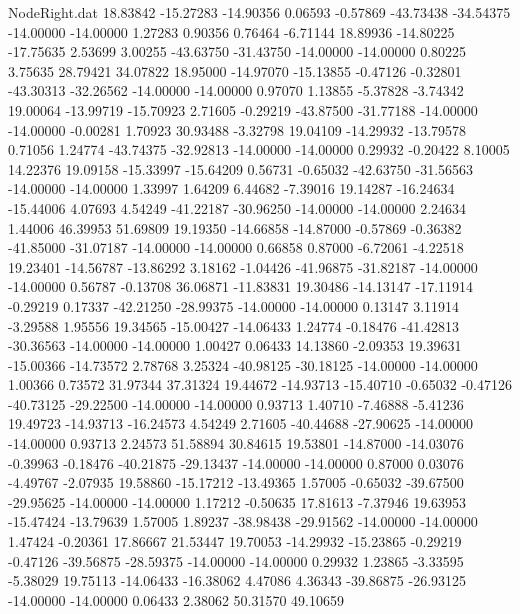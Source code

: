 \begin{filecontents}{NodeRight.dat}
  18.83842  -15.27283  -14.90356     0.06593   -0.57869  -43.73438  -34.54375  -14.00000  -14.00000    1.27283    0.90356    0.76464   -6.71144
  18.89936  -14.80225  -17.75635     2.53699    3.00255  -43.63750  -31.43750  -14.00000  -14.00000    0.80225    3.75635   28.79421   34.07822
  18.95000  -14.97070  -15.13855    -0.47126   -0.32801  -43.30313  -32.26562  -14.00000  -14.00000    0.97070    1.13855   -5.37828   -3.74342
  19.00064  -13.99719  -15.70923     2.71605   -0.29219  -43.87500  -31.77188  -14.00000  -14.00000   -0.00281    1.70923   30.93488   -3.32798
  19.04109  -14.29932  -13.79578     0.71056    1.24774  -43.74375  -32.92813  -14.00000  -14.00000    0.29932   -0.20422    8.10005   14.22376
  19.09158  -15.33997  -15.64209     0.56731   -0.65032  -42.63750  -31.56563  -14.00000  -14.00000    1.33997    1.64209    6.44682   -7.39016
  19.14287  -16.24634  -15.44006     4.07693    4.54249  -41.22187  -30.96250  -14.00000  -14.00000    2.24634    1.44006   46.39953   51.69809
  19.19350  -14.66858  -14.87000    -0.57869   -0.36382  -41.85000  -31.07187  -14.00000  -14.00000    0.66858    0.87000   -6.72061   -4.22518
  19.23401  -14.56787  -13.86292     3.18162   -1.04426  -41.96875  -31.82187  -14.00000  -14.00000    0.56787   -0.13708   36.06871  -11.83831
  19.30486  -14.13147  -17.11914    -0.29219    0.17337  -42.21250  -28.99375  -14.00000  -14.00000    0.13147    3.11914   -3.29588    1.95556
  19.34565  -15.00427  -14.06433     1.24774   -0.18476  -41.42813  -30.36563  -14.00000  -14.00000    1.00427    0.06433   14.13860   -2.09353
  19.39631  -15.00366  -14.73572     2.78768    3.25324  -40.98125  -30.18125  -14.00000  -14.00000    1.00366    0.73572   31.97344   37.31324
  19.44672  -14.93713  -15.40710    -0.65032   -0.47126  -40.73125  -29.22500  -14.00000  -14.00000    0.93713    1.40710   -7.46888   -5.41236
  19.49723  -14.93713  -16.24573     4.54249    2.71605  -40.44688  -27.90625  -14.00000  -14.00000    0.93713    2.24573   51.58894   30.84615
  19.53801  -14.87000  -14.03076    -0.39963   -0.18476  -40.21875  -29.13437  -14.00000  -14.00000    0.87000    0.03076   -4.49767   -2.07935
  19.58860  -15.17212  -13.49365     1.57005   -0.65032  -39.67500  -29.95625  -14.00000  -14.00000    1.17212   -0.50635   17.81613   -7.37946
  19.63953  -15.47424  -13.79639     1.57005    1.89237  -38.98438  -29.91562  -14.00000  -14.00000    1.47424   -0.20361   17.86667   21.53447
  19.70053  -14.29932  -15.23865    -0.29219   -0.47126  -39.56875  -28.59375  -14.00000  -14.00000    0.29932    1.23865   -3.33595   -5.38029
  19.75113  -14.06433  -16.38062     4.47086    4.36343  -39.86875  -26.93125  -14.00000  -14.00000    0.06433    2.38062   50.31570   49.10659

\end{filecontents}
